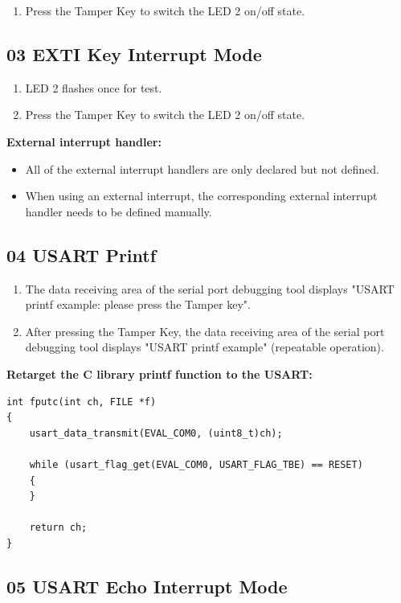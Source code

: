 \documentclass[12pt,a4paper]{ctexart}
\begin{document}
\begin{enumerate}
    \item Press the Tamper Key to switch the LED 2 on/off state.
\end{enumerate}

\subsection{03 EXTI Key Interrupt Mode}

\begin{enumerate}
    \item LED 2 flashes once for test.
    \item Press the Tamper Key to switch the LED 2 on/off state.
\end{enumerate}

\textbf{External interrupt handler:}
\begin{itemize}
    \item All of the external interrupt handlers are only declared but not defined.
    \item When using an external interrupt, the corresponding external interrupt handler needs to be defined manually.
\end{itemize}

\subsection{04 USART Printf}

\begin{enumerate}
    \item The data receiving area of the serial port debugging tool displays "USART printf example: please press the Tamper key".
    \item After pressing the Tamper Key, the data receiving area of the serial port debugging tool displays "USART printf example" (repeatable operation).
\end{enumerate}

\textbf{Retarget the C library printf function to the USART:}
\begin{verbatim}
int fputc(int ch, FILE *f)
{
    usart_data_transmit(EVAL_COM0, (uint8_t)ch);

    while (usart_flag_get(EVAL_COM0, USART_FLAG_TBE) == RESET)
    {
    }

    return ch;
}
\end{verbatim}

\subsection{05 USART Echo Interrupt Mode}
\end{document}

